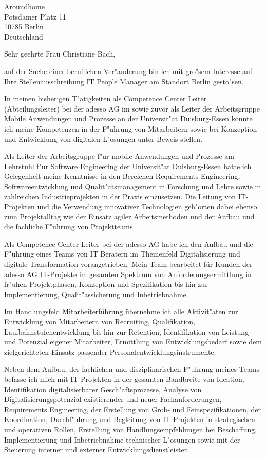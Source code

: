 \documentclass[10pt,a4paper]{dinbrief}
\date{\today}
\begin{document}
 
\begin{letter}  
{%
	Aroundhome\\
	Potsdamer Platz 11\\
	10785 Berlin\\
	Deutschland
}
\subject{\bf Bewerbung IT People Manager}
\opening{Sehr geehrte Frau Christiane Bach,}
auf der Suche einer beruflichen Ver"anderung bin ich mit gro"sem Interesse auf Ihre Stellenausschreibung IT People Manager am Standort Berlin gesto"sen. 

In meinen bisherigen T"atigkeiten als Competence Center Leiter (Abteilungsleiter) bei der adesso AG im sowie zuvor als Leiter der Arbeitsgruppe Mobile Anwendungen und Prozesse an der Universit"at Duisburg-Essen konnte ich meine Kompetenzen in der F"uhrung von Mitarbeitern sowie bei Konzeption und Entwicklung von digitalen L"osungen unter Beweis stellen.

Als Leiter der Arbeitsgruppe f"ur mobile Anwendungen und Prozesse am Lehrstuhl f"ur Software Engineering der Universit"at Duisburg-Essen hatte ich Gelegenheit meine Kenntnisse in den Bereichen Requirements Engineering, Softwareentwicklung und Qualit"atsmanagement in Forschung und Lehre sowie in zahlreichen Industrieprojekten in der Praxis einzusetzen. Die Leitung von IT-Projekten und die Verwendung innovativer Technologien geh"orten dabei ebenso zum Projektalltag wie der Einsatz agiler Arbeitsmethoden und der Aufbau und die fachliche F"uhrung von Projektteams.

Als Competence Center Leiter bei der adesso AG habe ich den Aufbau und die F"uhrung eines Teams von IT Beratern im Themenfeld Digitalisierung und digitale Transformation vorangetrieben. Mein Team bearbeitet für Kunden der adesso AG IT-Projekte im gesamten Spektrum von Anforderungsermittlung in fr"uhen Projektphasen, Konzeption und Spezifikation bis hin zur Implementierung, Qualit"assicherung und Inbetriebnahme.

Im Handlungsfeld Mitarbeiterführung übernehme ich alle Aktivit"aten zur Entwicklung von Mitarbeitern von Recruiting, Qualifikation, Laufbahnstufenentwicklung bis hin zur Retention, Identifikation von Leistung und Potenzial eigener Mitarbeiter, Ermittlung von Entwicklungsbedarf sowie dem zielgerichteten Einsatz passender Personalentwicklungsinstrumente.\clearpage

Neben dem Aufbau, der fachlichen und disziplinarischen F"uhrung meines Teams befasse ich mich  mit IT-Projekten in der gesamten Bandbreite von Ideation, Identifikation digitalisierbarer Gesch"afts\-prozesse, Analyse von Digitalisierungspotenzial existierender und neuer Fachanforderungen, Requirements Engineering, der Erstellung von Grob- und Feinspezifikationen, der Koordination, Durchf"uhrung und Begleitung von IT-Projekten in strategischen und operativen Rollen, Erstellung von Handlungsempfehlungen bei Beschaffung, Implementierung und Inbetriebnahme technischer L"osungen sowie mit der Steuerung interner und externer Entwicklungsdienstleister. 


\end{letter}
\end{document}
